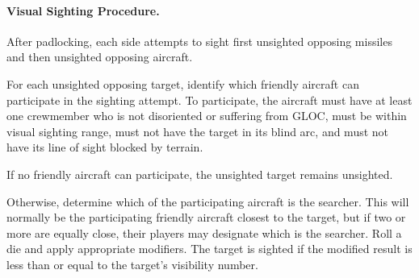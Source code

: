 {

\paragraph{Visual Sighting Procedure.}

After padlocking, each side attempts to sight first unsighted opposing missiles and then unsighted opposing aircraft.

For each unsighted opposing target, identify which friendly aircraft can participate in the sighting attempt. To participate, the aircraft must have at least one crewmember who is not disoriented or suffering from GLOC, must be within visual sighting range, must not have the target in its blind arc, and must not have its line of sight blocked by terrain. 

If no friendly aircraft can participate, the unsighted target remains unsighted.

Otherwise, determine which of the participating aircraft is the searcher. This will normally be the participating friendly aircraft closest to the target, but if two or more are equally close, their players may designate which is the searcher. Roll a die and apply appropriate modifiers. The target is sighted if the modified result is less than or equal to the target's visibility number.


}



